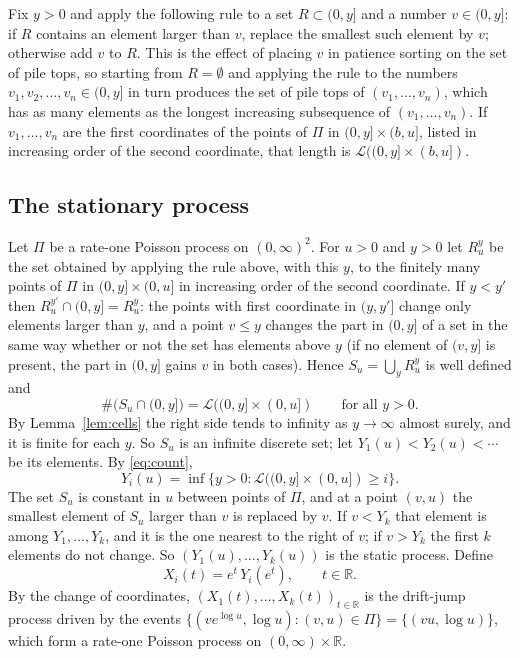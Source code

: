 \documentclass[11pt]{amsart}
\theoremstyle{remark}
\numberwithin{equation}{section}
\begin{document}
Fix $y>0$ and apply the following rule to a set $R\subset(0,y]$ and a number $v\in(0,y]$: if $R$ contains an element larger than $v$, replace the smallest such element by $v$; otherwise add $v$ to $R$. This is the effect of placing $v$ in patience sorting on the set of pile tops, so starting from $R=\emptyset$ and applying the rule to the numbers $v_1,v_2,\dots,v_n\in(0,y]$ in turn produces the set of pile tops of $(v_1,\dots,v_n)$, which has as many elements as the longest increasing subsequence of $(v_1,\dots,v_n)$. If $v_1,\dots,v_n$ are the first coordinates of the points of $\Pi$ in $(0,y]\times(b,u]$, listed in increasing order of the second coordinate, that length is $\mathcal L((0,y]\times(b,u])$.

\subsection{The stationary process}
Let $\Pi$ be a rate-one Poisson process on $(0,\infty)^2$. For $u>0$ and $y>0$ let $R^y_u$ be the set obtained by applying the rule above, with this $y$, to the finitely many points of $\Pi$ in $(0,y]\times(0,u]$ in increasing order of the second coordinate. If $y<y'$ then $R^{y'}_u\cap(0,y]=R^y_u$: the points with first coordinate in $(y,y']$ change only elements larger than $y$, and a point $v\le y$ changes the part in $(0,y]$ of a set in the same way whether or not the set has elements above $y$ (if no element of $(v,y]$ is present, the part in $(0,y]$ gains $v$ in both cases). Hence $S_u=\bigcup_yR^y_u$ is well defined and
\begin{equation}\label{eq:count}
\#\bigl(S_u\cap(0,y]\bigr)=\mathcal L((0,y]\times(0,u])\qquad\text{for all }y>0 .
\end{equation}
By Lemma~\ref{lem:cells} the right side tends to infinity as $y\to\infty$ almost surely, and it is finite for each $y$. So $S_u$ is an infinite discrete set; let $Y_1(u)<Y_2(u)<\cdots$ be its elements. By \eqref{eq:count},
\begin{equation}\label{eq:Yi}
Y_i(u)=\inf\{y>0:\mathcal L((0,y]\times(0,u])\ge i\}.
\end{equation}
The set $S_u$ is constant in $u$ between points of $\Pi$, and at a point $(v,u)$ the smallest element of $S_u$ larger than $v$ is replaced by $v$. If $v<Y_k$ that element is among $Y_1,\dots,Y_k$, and it is the one nearest to the right of $v$; if $v>Y_k$ the first $k$ elements do not change. So $(Y_1(u),\dots,Y_k(u))$ is the static process. Define
\[
X_i(t)=e^{t}\,Y_i(e^t),\qquad t\in\mathbb R .
\]
By the change of coordinates, $(X_1(t),\dots,X_k(t))_{t\in\mathbb R}$ is the drift-jump process driven by the events $\{(ve^{\log u},\log u):(v,u)\in\Pi\}=\{(vu,\log u)\}$, which form a rate-one Poisson process on $(0,\infty)\times\mathbb R$.
\end{document}
